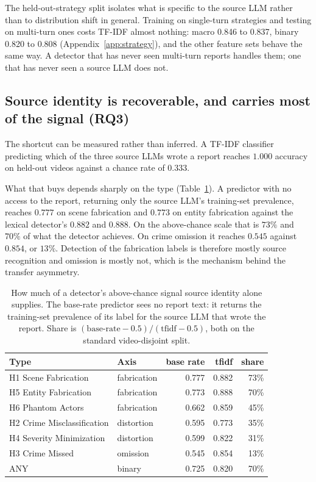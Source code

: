 \documentclass{article}
\begin{document}
The held-out-strategy split isolates what is specific to the source LLM rather
than to distribution shift in general. Training on single-turn strategies and
testing on multi-turn ones costs TF-IDF almost nothing: macro 0.846 to 0.837,
binary 0.820 to 0.808 (Appendix~\ref{app:strategy}), and the other feature sets behave the same way. A detector that has never seen multi-turn reports handles
them; one that has never seen a source LLM does not.

\subsection{Source identity is recoverable, and carries most of the signal (RQ3)}
\label{sec:shortcut}

The shortcut can be measured rather than inferred. A TF-IDF classifier
predicting which of the three source LLMs wrote a report reaches $1.000$
accuracy on held-out videos against a chance rate of $0.333$.

What that buys depends sharply on the type (Table~\ref{tab:baserate}). A
predictor with no access to the report, returning only the source LLM's
training-set prevalence, reaches $0.777$ on scene fabrication and $0.773$ on
entity fabrication against the lexical detector's $0.882$ and $0.888$. On the
above-chance scale that is $73\%$ and $70\%$ of what the detector achieves. On
crime omission it reaches $0.545$ against $0.854$, or $13\%$. Detection of the
fabrication labels is therefore mostly source recognition and omission is
mostly not, which is the mechanism behind the transfer asymmetry.

\begin{table}[t]
\caption{How much of a detector's above-chance signal source identity alone
supplies. The base-rate predictor sees no report text: it returns the
training-set prevalence of its label for the source LLM that wrote the report.
Share is $(\text{base-rate}-0.5)/(\text{tfidf}-0.5)$, both on the standard
video-disjoint split.}
\label{tab:baserate}
\centering\small
\begin{tabular}{llrrr}
\toprule
Type & Axis & base rate & tfidf & share \\
\midrule
H1 Scene Fabrication       & fabrication & 0.777 & 0.882 & 73\% \\
H5 Entity Fabrication      & fabrication & 0.773 & 0.888 & 70\% \\
H6 Phantom Actors          & fabrication & 0.662 & 0.859 & 45\% \\
H2 Crime Misclassification & distortion  & 0.595 & 0.773 & 35\% \\
H4 Severity Minimization   & distortion  & 0.599 & 0.822 & 31\% \\
H3 Crime Missed            & omission    & 0.545 & 0.854 & 13\% \\
\midrule
ANY                        & binary      & 0.725 & 0.820 & 70\% \\
\bottomrule
\end{tabular}
\end{table}
\end{document}
